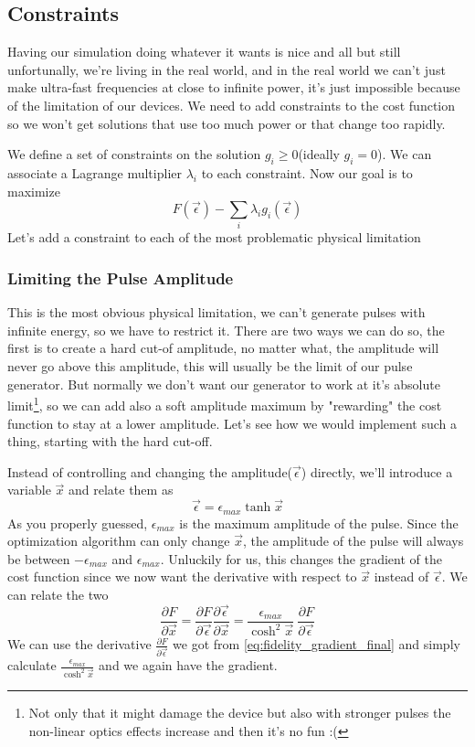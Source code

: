 \documentclass[english, a4paper, 12pt, twoside]{article}
\numberwithin{equation}{section} %
\begin{document}
\subsection{Constraints}
Having our simulation doing whatever it wants is nice and all but still unfortunally, we're living in the real world, and in the real world we can't just make ultra-fast frequencies at close to infinite power, it's just impossible because of the limitation of our devices. We need to add constraints to the cost function so we won't get solutions that use too much power or that change too rapidly.

We define a set of constraints on the solution ${g_i \ge 0}$(ideally $g_i=0$). We can associate a Lagrange multiplier $\lambda_i$ to each constraint. \newline
Now our goal is to maximize 
$$F(\vec{\epsilon}) - \sum_i \lambda_i g_i(\vec{\epsilon})$$
Let's add a constraint to each of the most problematic physical limitation
\subsubsection{Limiting the Pulse Amplitude}
This is the most obvious physical limitation, we can't generate pulses with infinite energy, so we have to restrict it. There are two ways we can do so, the first is to create a hard cut-of amplitude, no matter what, the amplitude will never go above this amplitude, this will usually be the limit of our pulse generator. But normally we don't want our generator to work at it's absolute limit\footnote{Not only that it might damage the device but also with stronger pulses the non-linear optics effects increase and then it's no fun :(}, so we can add also a soft amplitude maximum by "rewarding" the cost function to stay at a lower amplitude. Let's see how we would implement such a thing, starting with the hard cut-off.

Instead of controlling and changing the amplitude($\vec{\epsilon}$) directly, we'll introduce a variable $\vec{x}$ and relate them as
$$\vec{\epsilon} = \epsilon_{max}\tanh{\vec{x}}$$
As you properly guessed, $\epsilon_{max}$ is the maximum amplitude of the pulse.
Since the optimization algorithm can only change $\vec{x}$, the amplitude of the pulse will always be between $-\epsilon_{max}$ and $\epsilon_{max}$. Unluckily for us, this changes the gradient of the cost function since we now want the derivative with respect to $\vec{x}$ instead of $\vec{\epsilon}$. We can relate the two
\[
\frac{\partial F}{\partial \vec{x}} = \frac{\partial F}{\partial \vec{\epsilon}}\frac{\partial \vec{\epsilon}}{\partial \vec{x}} = \frac{\epsilon_{max}}{\cosh^2{\vec{x}}} \ \frac{\partial F}{\partial \vec{\epsilon}}
\]
We can use the derivative $\frac{\partial F}{\partial \vec{\epsilon}}$ we got from \ref{eq:fidelity_gradient_final} and simply calculate $\frac{\epsilon_{max}}{\cosh^2{\vec{x}}}$ and we again have the gradient.
\end{document}

